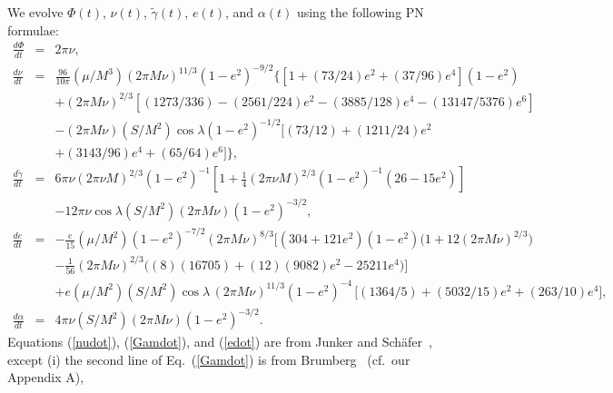 \documentclass[11pt]{report}
\begin{document}
We evolve $\Phi(t)$, $\nu(t)$, $\tilde\gamma(t)$, $e(t)$,
and $\alpha(t)$ using the following PN formulae:
\begin{eqnarray}
\frac{d\Phi}{dt} &=& 2\pi\nu, \label{Phidot} \\
%
\frac{d\nu}{dt} &=&
\frac{96}{10\pi}(\mu/M^3)(2\pi M\nu)^{11/3}(1-e^2)^{-9/2}
\bigl\{
\left[1+(73/24)e^2+(37/96)e^4\right](1-e^2) \nonumber \\
&&+ (2\pi M\nu)^{2/3}\left[(1273/336)-(2561/224)e^2-(3885/128)e^4
-(13147/5376)e^6 \right] \nonumber \\
&&- (2\pi M\nu)(S/M^2)\cos\lambda (1-e^2)^{-1/2}\bigl[(73/12)
+ (1211/24)e^2 \nonumber \\
&&+(3143/96)e^4 +(65/64)e^6 \bigr]
\bigr\}, \label{nudot} \\
%
\frac{d\tilde\gamma}{dt} &=& 6\pi\nu(2\pi\nu M)^{2/3} (1-e^2)^{-1}
\left[1+\frac{1}{4}(2\pi\nu M)^{2/3} (1-e^2)^{-1}(26-15e^2)\right] \nonumber \\
&&-12\pi\nu\cos\lambda (S/M^2) (2\pi M\nu)(1-e^2)^{-3/2},
\label{Gamdot} \\
%
\frac{de}{dt}  &=& -\frac{e}{15}(\mu/M^2) (1-e^2)^{-7/2} (2\pi M\nu)^{8/3}
\bigl[(304+121e^2)(1-e^2)\bigl(1 + 12 (2\pi M\nu)^{2/3}\bigr) \, \nonumber \\
&&- \frac{1}{56}(2\pi M\nu)^{2/3}\bigl( (8)(16705) + (12)(9082)e^2 - 25211e^4 \bigr)\bigr]\,
\nonumber \\
&&+ e (\mu/M^2)(S/M^2)\cos\lambda\,(2\pi M\nu)^{11/3}(1-e^2)^{-4}
\, \bigl[(1364/5) + (5032/15)e^2 + (263/10)e^4\bigr] ,
\label{edot} \\
%
\frac{d\alpha}{dt} &=& 4\pi\nu (S/M^2) (2\pi M\nu)(1-e^2)^{-3/2}.
\label{alphadot}
\end{eqnarray}
Equations (\ref{nudot}), (\ref{Gamdot}), and (\ref{edot}) are from
Junker and Sch\"afer~\cite{JunkerSchaefer}, except (i) the second line
of Eq.\ (\ref{Gamdot}) is from Brumberg~\cite{Brumberg}
(cf.\ our Appendix A),
\end{document}

